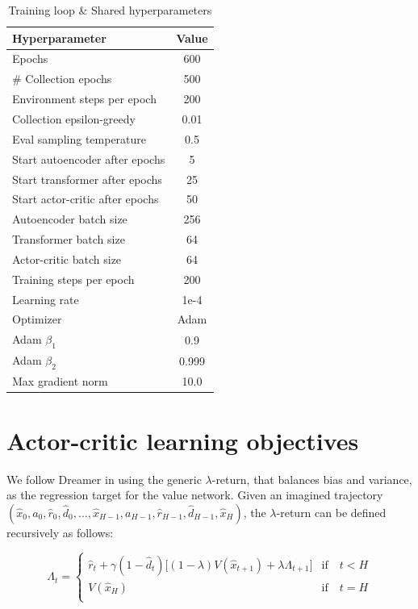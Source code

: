 \begin{table}[h]
  \caption{Training loop \& Shared hyperparameters}
  \label{tables:shared}
  \centering
  \begin{tabular}{lc}
    \toprule
    Hyperparameter     & Value \\
    \midrule
    Epochs  & 600 \\
    \# Collection epochs & 500 \\
    Environment steps per epoch & 200 \\
    Collection epsilon-greedy & 0.01 \\
    Eval sampling temperature & 0.5 \\
    Start autoencoder after epochs & 5 \\
    Start transformer after epochs & 25 \\
    Start actor-critic after epochs & 50 \\
    Autoencoder batch size & 256 \\
    Transformer batch size & 64 \\
    Actor-critic batch size & 64 \\
    \midrule
    Training steps per epoch & 200 \\
    Learning rate & 1e-4 \\
    Optimizer & Adam \\ %
    Adam $\beta_1$ & 0.9 \\
    Adam $\beta_2$ & 0.999 \\
    Max gradient norm & 10.0 \\
    \bottomrule
  \end{tabular}
\end{table}

\newpage

\section{Actor-critic learning objectives}
\label{appendix:actor_critic}

We follow Dreamer \citep{dreamerv1,dreamerv2} in using the generic $\lambda$-return, that balances bias and variance, as the regression target for the value network. Given an imagined trajectory $(\hat{x}_0, a_0, \hat{r}_0, \hat{d}_0, \dots, \hat{x}_{H-1}, a_{H-1}, \hat{r}_{H-1}, \hat{d}_{H-1}, \hat{x}_H)$, the $\lambda$-return can be defined recursively as follows:

\begin{equation}
\Lambda_t = 
\begin{cases}
    \hat{r}_t + \gamma (1 - \hat{d}_t) \Big[ (1 - \lambda) V(\hat{x}_{t+1}) + \lambda \Lambda_{t+1} \Big]   & \text{if}\quad t < H \\
    V(\hat{x}_H)                                                                                            & \text{if}\quad t = H \\
\end{cases}
\end{equation}

